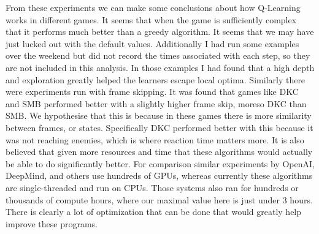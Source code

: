 From these experiments we can make some conclusions about how Q-Learning works
in different games. It seems that when the game is sufficiently complex that
it performs much better than a greedy algorithm. It seems that we may have just
lucked out with the default values. Additionally I had run some examples over
the weekend but did not record the times associated with each step, so they 
are not included in this analysis. In those examples I had found that a high 
depth and exploration greatly helped the learners escape local optima. 
Similarly there were experiments run with frame skipping. It was found that
games like DKC and SMB performed better with a slightly higher frame skip, moreso
DKC than SMB. We hypothesise that this is because in these games there is more 
similarity between frames, or states. Specifically DKC performed better with 
this because it was not reaching enemies, which is where reaction time matters
more. It is also believed that given more resources and time that these
algorithms would actually be able to do significantly better. For comparison
similar experiments by OpenAI, DeepMind, and others use hundreds of GPUs, 
whereas currently these algorithms are single-threaded and run on CPUs. 
Those systems also ran for hundreds or thousands of compute hours, where
our maximal value here is just under 3 hours.
There is clearly a lot of optimization that can be done that would greatly 
help improve these programs.

